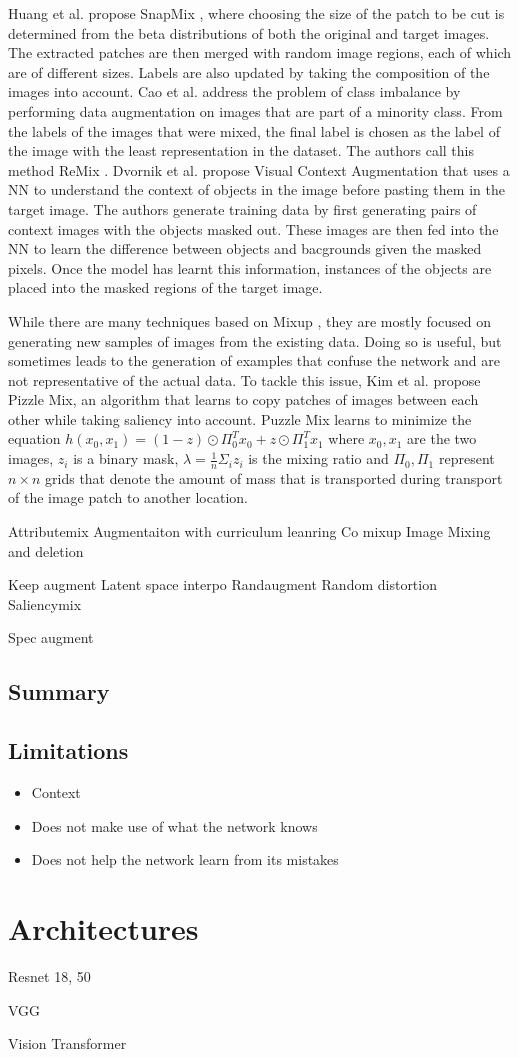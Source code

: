 Huang et al. propose SnapMix \cite{huangSnapMixSemanticallyProportional2021}, where choosing the size of the patch to be cut is determined from the beta distributions of both the original and target images. The extracted patches are then merged with random image regions, each of which are of different sizes. Labels are also updated by taking the composition of the images into account.
Cao et al. address the problem of class imbalance by performing data augmentation on images that are part of a minority class. From the labels of the images that were mixed, the final label is chosen as the label of the image with the least representation in the dataset. The authors call this method ReMix \cite{caoReMixImagetoImageTranslation2021}.
Dvornik et al. propose Visual Context Augmentation \cite{dvornikModelingVisualContext2018} that uses a NN to understand the context of objects in the image before pasting them in the target image. The authors generate training data by first generating pairs of context images with the objects masked out. These images are then fed into the NN to learn the difference between objects and bacgrounds given the masked pixels. Once the model has learnt this information, instances of the objects are placed into the masked regions of the target image.

While there are many techniques based on Mixup \cite{zhangMixupEmpiricalRisk2018}, they are mostly focused on generating new samples of images from the existing data. Doing so is useful, but sometimes leads to the generation of examples that confuse the network and are not representative of the actual data. To tackle this issue, Kim et al. \cite{kimPuzzleMixExploiting2020} propose Pizzle Mix, an algorithm that learns to copy patches of images between each other while taking saliency into account. Puzzle Mix learns to minimize the equation $h(x_{0}, x_{1}) = (1-z) \odot \Pi_{0}^{T}x_{0} + z \odot \Pi_{1}^{T}x_{1}$ where $x_{0}, x_{1}$ are the two images, $z_{i}$ is a binary mask, $\lambda = \frac{1}{n}\Sigma_{i}z_{i}$ is the mixing ratio and $\Pi_{0}, \Pi_{1}$ represent $n \times n$ grids that denote the amount of mass that is transported during transport of the image patch to another location. 


Attributemix
Augmentaiton with curriculum leanring
Co mixup
Image Mixing and deletion

Keep augment
Latent space interpo
Randaugment
Random distortion
Saliencymix

Spec augment



\subsection{Summary}
\subsection{Limitations}
\begin{itemize}
\item Context
\item Does not make use of what the network knows
\item Does not help the network learn from its mistakes
\end{itemize}
\section{Architectures}
Resnet 18, 50

VGG

Vision Transformer
